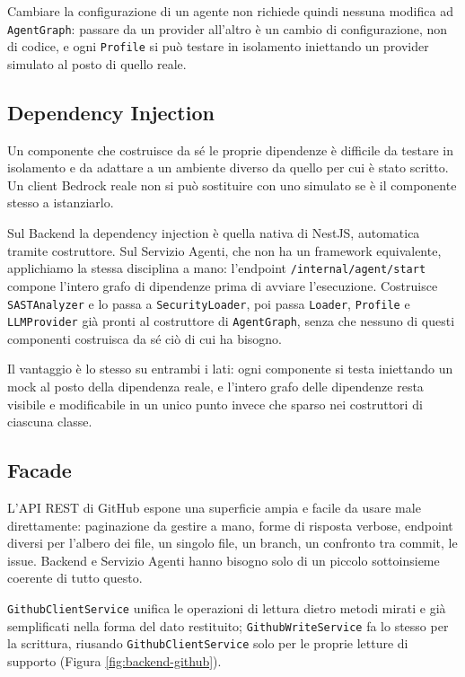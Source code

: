 \documentclass[12pt, a4paper]{article}
\begin{document}
Cambiare la configurazione di un agente non richiede quindi nessuna modifica ad \texttt{AgentGraph}: passare da un provider all'altro è un cambio di configurazione, non di codice, e ogni \texttt{Profile} si può testare in isolamento iniettando un provider simulato al posto di quello reale.

\subsection{Dependency Injection}

Un componente che costruisce da sé le proprie dipendenze è difficile da testare in isolamento e da adattare a un ambiente diverso da quello per cui è stato scritto. Un client Bedrock reale non si può sostituire con uno simulato se è il componente stesso a istanziarlo.

Sul Backend la dependency injection è quella nativa di NestJS, automatica tramite costruttore. Sul Servizio Agenti, che non ha un framework equivalente, applichiamo la stessa disciplina a mano: l'endpoint \texttt{/internal/agent/start} compone l'intero grafo di dipendenze prima di avviare l'esecuzione. Costruisce \texttt{SASTAnalyzer} e lo passa a \texttt{SecurityLoader}, poi passa \texttt{Loader}, \texttt{Profile} e \texttt{LLMProvider} già pronti al costruttore di \texttt{AgentGraph}, senza che nessuno di questi componenti costruisca da sé ciò di cui ha bisogno.

Il vantaggio è lo stesso su entrambi i lati: ogni componente si testa iniettando un mock al posto della dipendenza reale, e l'intero grafo delle dipendenze resta visibile e modificabile in un unico punto invece che sparso nei costruttori di ciascuna classe.

\subsection{Facade}

L'API REST di GitHub espone una superficie ampia e facile da usare male direttamente: paginazione da gestire a mano, forme di risposta verbose, endpoint diversi per l'albero dei file, un singolo file, un branch, un confronto tra commit, le issue. Backend e Servizio Agenti hanno bisogno solo di un piccolo sottoinsieme coerente di tutto questo.

\texttt{GithubClientService} unifica le operazioni di lettura dietro metodi mirati e già semplificati nella forma del dato restituito; \texttt{GithubWriteService} fa lo stesso per la scrittura, riusando \texttt{GithubClientService} solo per le proprie letture di supporto (Figura \ref{fig:backend-github}).
\end{document}
